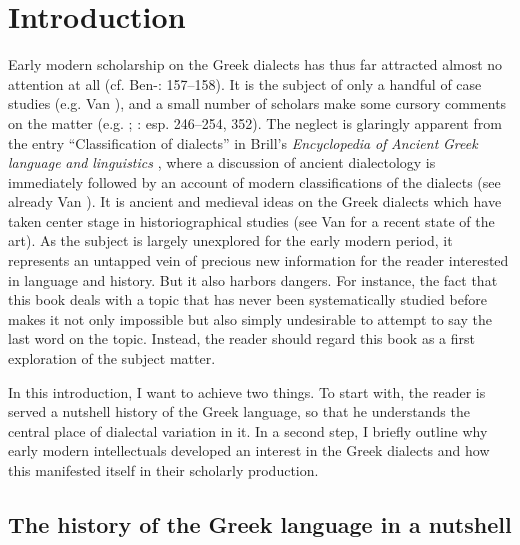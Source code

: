 \chapter{Introduction}

Early modern scholarship on the Greek dialects has thus far attracted almost no attention at all (cf. Ben-\citealt{Tov2009}: 157–158). It is the subject of only a handful of case studies (e.g. Van \citealt{Rooy2016c}), and a small number of scholars make some cursory comments on the matter (e.g. \citealt{Botley2010}; \citealt{Roelcke2014}: esp. 246–254, 352). The neglect is glaringly apparent from the entry “Classification of dialects” in Brill’s \textit{Encyclopedia} \textit{of} \textit{Ancient} \textit{Greek} \textit{language} \textit{and} \textit{linguistics} \citep{Finkelberg2014}, where a discussion of ancient dialectology is immediately followed by an account of modern classifications of the dialects (see already Van \citealt{Rooy2016a}). It is ancient and medieval ideas on the Greek dialects which have taken center stage in historiographical studies (see Van \citealt{Rooy2018b} for a recent state of the art). As the subject is largely unexplored for the early modern period, it represents an untapped vein of precious new information for the reader interested in language and history. But it also harbors dangers. For instance, the fact that this book deals with a topic that has never been systematically studied before makes it not only impossible but also simply undesirable to attempt to say the last word on the topic. Instead, the reader should regard this book as a first exploration of the subject matter.

In this introduction, I want to achieve two things. To start with, the reader is served a nutshell history of the Greek language, so that he understands the central place of dialectal variation in it. In a second step, I briefly outline why early modern intellectuals developed an interest in the Greek dialects and how this manifested itself in their scholarly production.

\section{The history of the Greek language in a nutshell}

